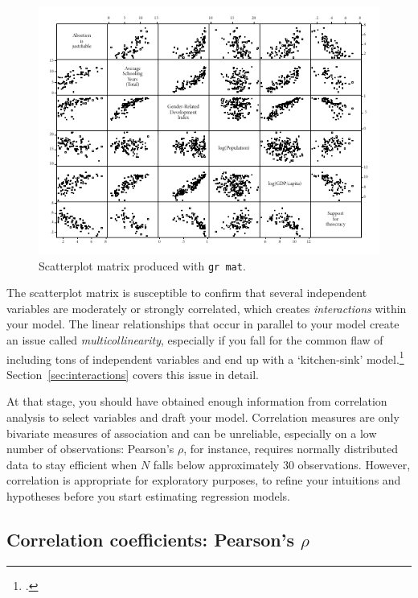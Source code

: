 \begin{figure}[htp]
	\centering
	\includegraphics[width=.9\textwidth]{images/abortion_grmat.pdf}

	\caption[Scatterplot matrix with ]{\label{fig:grmat}
	Scatterplot matrix produced with \texttt{gr mat}.\\
	}
\end{figure}%

The scatterplot matrix is susceptible to confirm that several independent variables are moderately or strongly correlated, which creates \emph{interactions} within your model. The linear relationships that occur in parallel to your model create an issue called \emph{multicollinearity}, especially if you fall for the common flaw of including tons of independent variables and end up with a `kitchen-sink' model.\footcite{Schrodt:2011a} Section~\ref{sec:interactions} covers this issue in detail.

At that stage, you should have obtained enough information from correlation analysis to select variables and draft your model. Correlation measures are only bivariate measures of association and can be unreliable, especially on a low number of observations: Pearson's $\rho$, for instance, requires normally distributed data to stay efficient when $N$ falls below approximately 30 observations. However, correlation is appropriate for exploratory purposes, to refine your intuitions and hypotheses before you start estimating regression models.

  \subsection{Correlation coefficients: Pearson's $\rho$}

